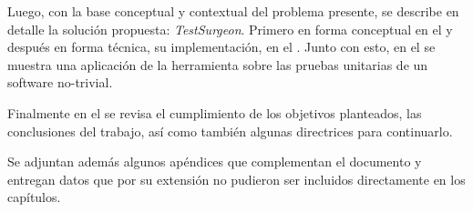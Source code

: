 \par Luego, con la base conceptual y contextual del problema presente, se describe en detalle la solución propuesta: \emph{TestSurgeon}. Primero en forma conceptual en el  y después en forma técnica, su implementación, en el . Junto con esto, en el  se muestra una aplicación de la herramienta sobre las pruebas unitarias de un software no-trivial. 

\par Finalmente en el  se revisa el cumplimiento de los objetivos planteados, las conclusiones del trabajo, así como también algunas directrices para continuarlo.

\par Se adjuntan además algunos apéndices que complementan el documento y entregan datos que por su extensión no pudieron ser incluidos directamente en los capítulos.
